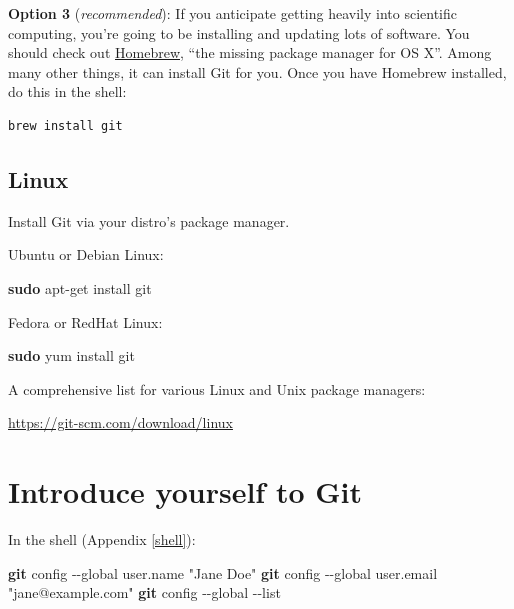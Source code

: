\documentclass[
]{book}
\newenvironment{Shaded}{\begin{snugshade}}{\end{snugshade}}
\newcommand{\AttributeTok}[1]{\textcolor[rgb]{0.13,0.29,0.53}{#1}}
\newcommand{\FunctionTok}[1]{\textcolor[rgb]{0.13,0.29,0.53}{\textbf{#1}}}
\newcommand{\NormalTok}[1]{#1}
\newcommand{\StringTok}[1]{\textcolor[rgb]{0.31,0.60,0.02}{#1}}
\begin{document}
\textbf{Option 3} (\emph{recommended}): If you anticipate getting heavily into scientific computing, you're going to be installing and updating lots of software. You should check out \href{http://brew.sh}{Homebrew}, ``the missing package manager for OS X''. Among many other things, it can install Git for you. Once you have Homebrew installed, do this in the shell:

\begin{verbatim}
brew install git
\end{verbatim}

\section{Linux}\label{linux}

Install Git via your distro's package manager.

Ubuntu or Debian Linux:

\begin{Shaded}
\begin{Highlighting}[]
\FunctionTok{sudo}\NormalTok{ apt{-}get install git}
\end{Highlighting}
\end{Shaded}

Fedora or RedHat Linux:

\begin{Shaded}
\begin{Highlighting}[]
\FunctionTok{sudo}\NormalTok{ yum install git}
\end{Highlighting}
\end{Shaded}

A comprehensive list for various Linux and Unix package managers:

\url{https://git-scm.com/download/linux}

\chapter{Introduce yourself to Git}\label{hello-git}

In the shell (Appendix \ref{shell}):

\begin{Shaded}
\begin{Highlighting}[]
\FunctionTok{git}\NormalTok{ config }\AttributeTok{{-}{-}global}\NormalTok{ user.name }\StringTok{"Jane Doe"}
\FunctionTok{git}\NormalTok{ config }\AttributeTok{{-}{-}global}\NormalTok{ user.email }\StringTok{"jane@example.com"}
\FunctionTok{git}\NormalTok{ config }\AttributeTok{{-}{-}global} \AttributeTok{{-}{-}list}
\end{Highlighting}
\end{Shaded}
\end{document}
